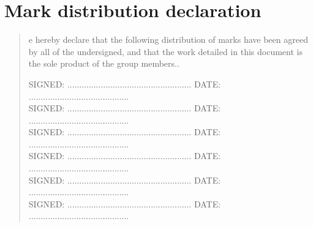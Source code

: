 %
%
%
%
%
%
\chapter*{Mark distribution declaration}
\begin{SingleSpace}
\begin{quote}
e hereby declare that the following distribution of marks have been agreed by all of the undersigned, and that the work detailed in this document is the sole product of the group members..

\bigskip
\hspace{-0.75cm}\textsc{SIGNED: .................................................... DATE: ..........................................}
\\

\bigskip
\hspace{-0.75cm}\textsc{SIGNED: .................................................... DATE: ..........................................}
\\

\bigskip
\hspace{-0.75cm}\textsc{SIGNED: .................................................... DATE: ..........................................}
\\

\bigskip
\hspace{-0.75cm}\textsc{SIGNED: .................................................... DATE: ..........................................}
\\

\bigskip\noindent
\hspace{-0.75cm}\textsc{SIGNED: .................................................... DATE: ..........................................}
\\

\bigskip
\noindent
\hspace{-0.75cm}\textsc{SIGNED: .................................................... DATE: ..........................................}
\\



\end{quote}
\end{SingleSpace}
\clearpage